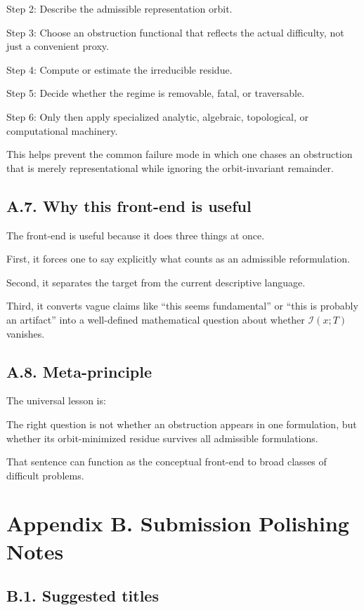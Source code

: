 \documentclass[
]{article}
\begin{document}
Step 2: Describe the admissible representation orbit.

Step 3: Choose an obstruction functional that reflects the actual
difficulty, not just a convenient proxy.

Step 4: Compute or estimate the irreducible residue.

Step 5: Decide whether the regime is removable, fatal, or traversable.

Step 6: Only then apply specialized analytic, algebraic, topological, or
computational machinery.

This helps prevent the common failure mode in which one chases an
obstruction that is merely representational while ignoring the
orbit-invariant remainder.

\subsection{A.7. Why this front-end is
useful}\label{a.7.-why-this-front-end-is-useful}

The front-end is useful because it does three things at once.

First, it forces one to say explicitly what counts as an admissible
reformulation.

Second, it separates the target from the current descriptive language.

Third, it converts vague claims like ``this seems fundamental'' or
``this is probably an artifact'' into a well-defined mathematical
question about whether \(\mathcal{I}(x;T)\) vanishes.

\subsection{A.8. Meta-principle}\label{a.8.-meta-principle}

The universal lesson is:

The right question is not whether an obstruction appears in one
formulation, but whether its orbit-minimized residue survives all
admissible formulations.

That sentence can function as the conceptual front-end to broad classes
of difficult problems.

\section{Appendix B. Submission Polishing
Notes}\label{appendix-b.-submission-polishing-notes}

\subsection{B.1. Suggested titles}\label{b.1.-suggested-titles}
\end{document}
